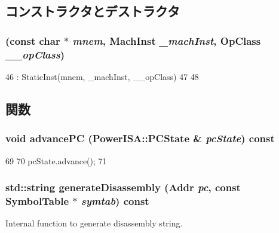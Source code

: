 \subsection{コンストラクタとデストラクタ}
\hypertarget{classPowerISA_1_1PowerStaticInst_a8b36d6713ea77a6426770333f53ba52e}{
\subsubsection[{PowerStaticInst}]{ (const char $\ast$ {\em mnem}, \/  {\bf MachInst} {\em \_\-machInst}, \/  OpClass {\em \_\-\_\-opClass})}}
\label{classPowerISA_1_1PowerStaticInst_a8b36d6713ea77a6426770333f53ba52e}



\begin{DoxyCode}
46         : StaticInst(mnem, _machInst, __opClass)
47     {
48     }
\end{DoxyCode}


\subsection{関数}
\hypertarget{classPowerISA_1_1PowerStaticInst_af4df5e33fa362c547928975229de8350}{
\subsubsection[{advancePC}]{\setlength{\rightskip}{0pt plus 5cm}void advancePC (PowerISA::PCState \& {\em pcState}) const}}
\label{classPowerISA_1_1PowerStaticInst_af4df5e33fa362c547928975229de8350}



\begin{DoxyCode}
69     {
70         pcState.advance();
71     }
\end{DoxyCode}
\hypertarget{classPowerISA_1_1PowerStaticInst_a95d323a22a5f07e14d6b4c9385a91896}{
\subsubsection[{generateDisassembly}]{\setlength{\rightskip}{0pt plus 5cm}std::string generateDisassembly ({\bf Addr} {\em pc}, \/  const SymbolTable $\ast$ {\em symtab}) const}}
\label{classPowerISA_1_1PowerStaticInst_a95d323a22a5f07e14d6b4c9385a91896}
Internal function to generate disassembly string. 

